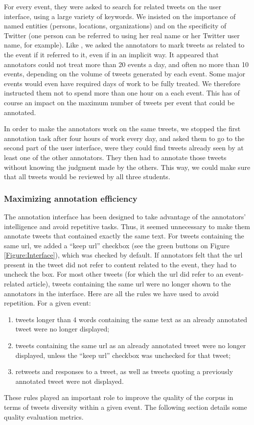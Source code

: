 For every event, they were asked to search for related tweets on the user interface, using a large variety of keywords. We insisted on the importance of named entities (persons, locations, organizations) and on the specificity of Twitter (one person can be referred to using her real name or her Twitter user name, for example). Like \citet{mcminn_building_2013}, we asked the annotators to mark tweets as related to the event if it referred to it, even if in an implicit way. It appeared that annotators could not treat more than 20 events a day, and often no more than 10 events, depending on the volume of tweets generated by each event. Some major events would even have required days of work to be fully treated. We therefore instructed them not to spend more than one hour on a each event. This has of course an impact on the maximum number of tweets per event that could be annotated. 

In order to make the annotators work on the same tweets, we stopped the first annotation task after four hours of work every day, and asked them to go to the second part of the user interface, were they could find tweets already seen by at least one of the other annotators. They then had to annotate those tweets without knowing the judgment made by the others. This way, we could make sure that all tweets would be reviewed by all three students.

\subsubsection{Maximizing annotation efficiency}
\label{annotation efficiency}
The annotation interface has been designed to take
advantage of the annotators’ intelligence and avoid
repetitive tasks. Thus, it seemed unnecessary to make
them annotate tweets that contained exactly the same text.
For tweets containing the same url, we added a “keep url”
checkbox (see the green buttons on Figure \ref{Figure:Interface}), which was
checked by default. If annotators felt that the url present in
the tweet did not refer to content related to the event, they
had to uncheck the box. For most other tweets (for which
the url did refer to an event-related article), tweets
containing the same url were no longer shown to the
annotators in the interface.
Here are all the rules we have used to avoid repetition. For
a given event:
\begin{enumerate}
    \item tweets longer than 4 words containing the same text as
an already annotated tweet were no longer displayed;
    \item tweets containing the same url as an already annotated
tweet were no longer displayed, unless the “keep url”
checkbox was unchecked for that tweet;
    \item retweets and responses to a tweet, as well as tweets
quoting a previously annotated tweet were not displayed.
\end{enumerate}
These rules played an important role to improve the
quality of the corpus in terms of tweets diversity within a
given event. The following section details some quality
evaluation metrics.

